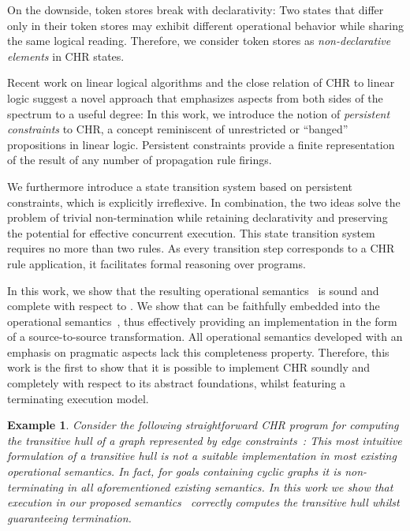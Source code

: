 \documentclass{tlp}
\newtheorem{example}{Example}[section]
\begin{document}
On the downside, token stores break with declarativity: Two states that differ
only in their token stores may exhibit different operational behavior while
sharing the same logical reading. Therefore, we consider token stores as
\emph{non-declarative elements} in CHR states.

Recent work on linear logical algorithms \cite{Simmons2008} and the close
relation of CHR to linear logic \cite{betzfruehwirth05} suggest a novel approach
that emphasizes aspects from both sides of the spectrum to a useful degree:
In this work, we introduce the notion of \emph{persistent constraints} to CHR, a
concept reminiscent of unrestricted or ``banged'' propositions in linear logic.
Persistent constraints provide a finite representation of the result of any
number of propagation rule firings.

We furthermore introduce a state transition system based on persistent
constraints, which is explicitly irreflexive. In combination, the two ideas
solve the problem of trivial non-termination while retaining declarativity and
preserving the potential for effective concurrent execution. This state
transition system requires no more than two rules. As every transition step
corresponds to a CHR rule application, it facilitates formal reasoning over
programs.

In this work, we show that the resulting operational semantics~ is sound
and complete with respect to . We show that  can be faithfully
embedded into the operational semantics~, thus effectively providing an
implementation in the form of a source-to-source transformation. All operational
semantics developed with an emphasis on pragmatic aspects lack this completeness
property. Therefore, this work is the first to show that it is possible to
implement CHR soundly and completely with respect to its abstract foundations,
whilst featuring a terminating execution model.

\begin{example}\label{ex:trans}
Consider the following straightforward CHR program for computing the transitive
hull of a graph represented by edge constraints~: 
This most intuitive formulation of a transitive hull is not a suitable
implementation in most existing operational semantics. In fact, for goals
containing cyclic graphs it is non-terminating in all aforementioned existing
semantics. In this work we show that execution in our proposed
semantics~ correctly computes the transitive hull whilst guaranteeing
termination.
\end{example}
\end{document}

